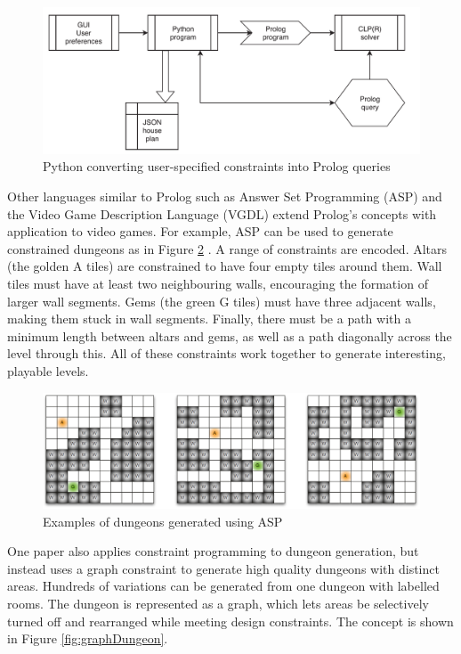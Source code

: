 \begin{figure}[H]
    \centering
    \includegraphics[width=\textwidth, height=0.3\textheight, keepaspectratio]{Images/PythonToProlog.png}
    \caption{Python converting user-specified constraints into Prolog queries \cite{Prolog_Deep_Learning}}
    \label{fig:pythonToProlog}
\end{figure}

Other languages similar to Prolog such as Answer Set Programming (ASP) and the Video Game Description Language (VGDL) extend Prolog's concepts with application to video games. For example, ASP can be used to generate constrained dungeons as in Figure \ref{fig:aspDungeons} \cite{pcgbook}. A range of constraints are encoded. Altars (the golden A tiles) are constrained to have four empty tiles around them. Wall tiles must have at least two neighbouring walls, encouraging the formation of larger wall segments. Gems (the green G tiles) must have three adjacent walls, making them stuck in wall segments. Finally, there must be a path with a minimum length between altars and gems, as well as a path diagonally across the level through this. All of these constraints work together to generate interesting, playable levels.

\begin{figure}[H]
    \centering
    \includegraphics[width=\textwidth, height=0.3\textheight, keepaspectratio]{Images/ASPDungeons.png}
    \caption{Examples of dungeons generated using ASP \cite{pcgbook}}
    \label{fig:aspDungeons}
\end{figure}

One paper \cite{Graph_Constraint_Dungeon} also applies constraint programming to dungeon generation, but instead uses a graph constraint to generate high quality dungeons with distinct areas. Hundreds of variations can be generated from one dungeon with labelled rooms. The dungeon is represented as a graph, which lets areas be selectively turned off and rearranged while meeting design constraints. The concept is shown in Figure \ref{fig:graphDungeon}.

